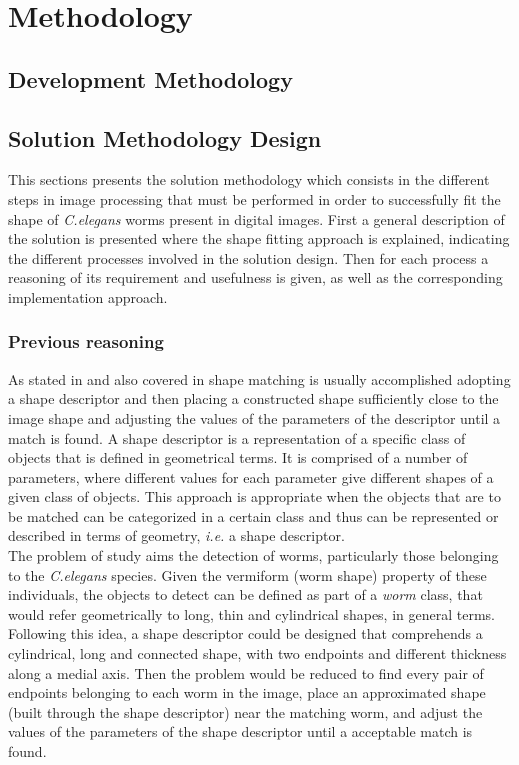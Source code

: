 \cleardoublepage  
\chapter{Methodology}
\label{chap:methodology}

\section{Development Methodology}
\label{sec:devmet}

\section{Solution Methodology Design}
\label{sec:solmet}

This sections presents the solution methodology which consists in the different
steps in image processing that must be performed in order to successfully fit the shape of 
\emph{C.elegans} worms present in digital images. First a general description
of the solution is presented where the shape fitting approach is explained, indicating
the different processes involved in the solution design. Then for each process 
a reasoning of its requirement and usefulness is given, as well as 
the corresponding 
implementation approach.

\subsection{Previous reasoning}
\label{sec:reasoning}

As stated in \cite{binaryshape} and also covered in
\cite{deformable,matching2,matchingbook} shape 
matching is usually accomplished adopting a shape
descriptor and then placing a constructed shape sufficiently 
close to the image shape and adjusting the values of 
the parameters of the descriptor until a match is found.
A shape descriptor is a representation of a 
specific class of objects that is defined in geometrical
terms. It is comprised of a number of parameters, where 
different values for each parameter give different 
shapes of a given class of objects.
This approach is appropriate when the objects
that are to be matched can be categorized in a certain 
class and thus can be represented or described in terms
of geometry, \emph{i.e.} a shape descriptor.\\

The problem of study aims the detection of worms,
particularly those belonging to the \emph{C.elegans} species. Given
the vermiform (worm shape) property of these individuals,
the objects to detect can be defined as part of a 
\emph{worm} class,
that would refer geometrically to long, thin and cylindrical 
shapes, in 
general terms. Following this idea, a shape descriptor could be
designed that comprehends a cylindrical, long and connected
shape, with two endpoints and different thickness along a medial
axis. Then the problem would be reduced to find every pair of
endpoints belonging to each worm in the image, place an approximated
shape (built through the shape descriptor) near the matching worm,
and adjust the values of the parameters of the shape descriptor until
a acceptable match is found.\\

